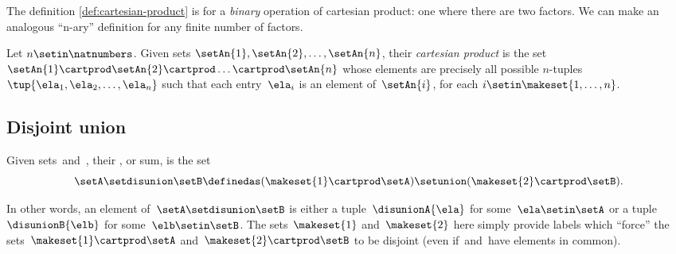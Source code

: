 The definition \cref{def:cartesian-product} is for a \emph{binary} operation of cartesian product: one where there are two factors.
We can make an analogous ``n-ary'' definition for any finite number of factors.

\begin{ctdefinition}
    \label{def:n-ary-cartesian-product}
    Let $n \setin \natnumbers$.
    Given sets $\setAn{1}, \setAn{2}, \dots, \setAn{n}$, their \emph{cartesian product} is the set $\setAn{1} \cartprod \setAn{2} \cartprod \dots \cartprod \setAn{n}$ whose elements are precisely all possible $n$-tuples~$\tup{\ela_{1}, \ela_{2}, \dots, \ela_{n}}$ such that each entry~$\ela_{i}$ is an element of~$\setAn{i}$, for each $i \setin \makeset{1, \dots, n}$.
\end{ctdefinition}

\subsection{Disjoint union}
\label{sec:disjoint-union}

\begin{ctdefinition}
    \label{def:disjoint-union-of-sets}
    Given sets~\setA and~\setB, their , or sum, is the set
    \begin{equation}
        \setA \setdisunion \setB \definedas ( \makeset{ 1 } \cartprod \setA) \setunion ( \makeset{2} \cartprod \setB).
    \end{equation}
\end{ctdefinition}
In other words, an element of~$\setA \setdisunion \setB$ is either a tuple~$\disunionA{\ela}$ for some~$\ela \setin\setA$ or a tuple $\disunionB{\elb}$ for some~$\elb \setin\setB$.
The sets~$\makeset{ 1 }$ and~$\makeset{2}$ here simply provide labels which ``force'' the sets~$\makeset{ 1 } \cartprod \setA$ and~$ \makeset{2} \cartprod \setB$ to be disjoint (even if~\setA and~\setB have elements in common).



